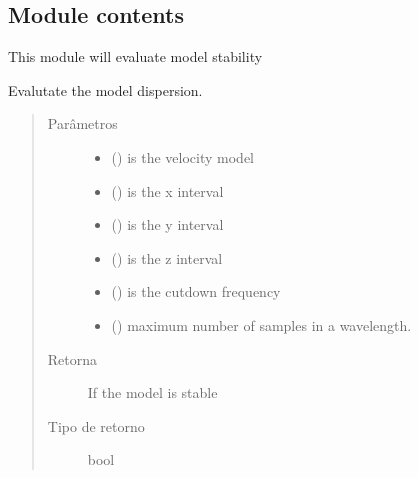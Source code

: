 \documentclass[letterpaper,10pt,brazil]{sphinxmanual}
\begin{document}
\subsection{Module contents}
\label{\detokenize{source/stability:module-stability}}\label{\detokenize{source/stability:module-contents}}
This module will evaluate model stability

\begin{fulllineitems}
\label{\detokenize{source/stability:stability.dispersion}}
Evalutate the model dispersion.
\begin{quote}\begin{description}
\item[{Parâmetros}] \leavevmode\begin{itemize}
\item {} 
 () \textendash{} is the velocity model

\item {} 
 () \textendash{} is the x interval

\item {} 
 () \textendash{} is the y interval

\item {} 
 () \textendash{} is the z interval

\item {} 
 () \textendash{} is the cutdown frequency

\item {} 
 () \textendash{} maximum number of samples in a wavelength.

\end{itemize}

\item[{Retorna}] \leavevmode
If the model is stable

\item[{Tipo de retorno}] \leavevmode
bool

\end{description}\end{quote}

\end{fulllineitems}
\end{document}
